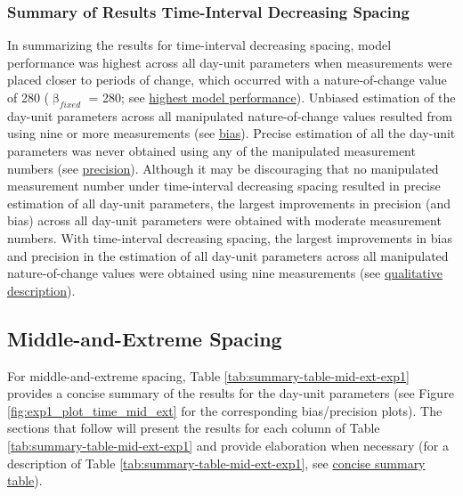 \documentclass[
12pt, %
twoside,
english]{guelphthesis}
\begin{document}
\hypertarget{summary-of-results-time-interval-decreasing-spacing}{%
\subsubsection{Summary of Results Time-Interval Decreasing Spacing}\label{summary-of-results-time-interval-decreasing-spacing}}

In summarizing the results for time-interval decreasing spacing, model performance was highest across all day-unit parameters when measurements were placed closer to periods of change, which occurred with a nature-of-change value of 280 (\(\upbeta_{fixed}\) = 280; see \protect\hyperlink{nature-change-time-dec-exp1}{highest model performance}). Unbiased estimation of the day-unit parameters across all manipulated nature-of-change values resulted from using nine or more measurements (see \protect\hyperlink{bias-time-dec-exp1}{bias}). Precise estimation of all the day-unit parameters was never obtained using any of the manipulated measurement numbers (see \protect\hyperlink{precision-time-dec-exp1}{precision}). Although it may be discouraging that no manipulated measurement number under time-interval decreasing spacing resulted in precise estimation of all day-unit parameters, the largest improvements in precision (and bias) across all day-unit parameters were obtained with moderate measurement numbers. With time-interval decreasing spacing, the largest improvements in bias and precision in the estimation of all day-unit parameters across all manipulated nature-of-change values were obtained using nine measurements (see \protect\hyperlink{qualitative-time-inc-exp1}{qualitative description}).

\hypertarget{middle-and-extreme-spacing}{%
\subsection{Middle-and-Extreme Spacing}\label{middle-and-extreme-spacing}}

For middle-and-extreme spacing, Table \ref{tab:summary-table-mid-ext-exp1} provides a concise summary of the results for the day-unit parameters (see Figure \ref{fig:exp1_plot_time_mid_ext} for the corresponding bias/precision plots). The sections that follow will present the results for each column of Table \ref{tab:summary-table-mid-ext-exp1} and provide elaboration when necessary (for a description of Table \ref{tab:summary-table-mid-ext-exp1}, see \protect\hyperlink{concise-tab}{concise summary table}).
\end{document}
